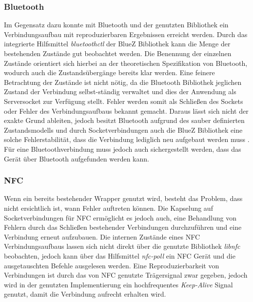 		\subsubsection{Bluetooth} Im Gegensatz dazu konnte mit Bluetooth und der genutzten Bibliothek ein \linebreak Verbindungsaufbau mit reproduzierbaren Ergebnissen erreicht werden. Durch das integrierte Hilfsmittel {\it bluetoothctl} der BlueZ Bibliothek kann die Menge der bestehenden Zustände gut beobachtet werden. Die Benennung der einzelnen Zustände orientiert sich hierbei an der theoretischen Spezifikation von Bluetooth, wodurch auch die Zustandsübergänge bereits klar werden. Eine feinere Betrachtung der Zustände ist nicht nötig, da die Bluetooth Bibliothek jeglichen Zustand der Verbindung selbst-ständig verwaltet und dies der Anwendung als Serversocket zur Verfügung stellt. Fehler werden somit als Schließen des Sockets oder Fehler des Verbindungsaufbaus bekannt gemacht. Daraus lässt sich nicht der exakte Grund ableiten, jedoch besitzt Bluetooth aufgrund des sauber definierten Zustandsmodells und durch Socketverbindungen auch die BlueZ Bibliothek eine solche Fehlerstabilität, dass die Verbindung lediglich neu aufgebaut werden muss \cite{bluetoothSpec}. Für eine Bluetoothverbindung muss jedoch auch  sichergestellt werden, dass das Gerät über Bluetooth aufgefunden werden kann.
		
          \subsubsection{NFC} Wenn ein bereits bestehender Wrapper genutzt wird, besteht das Problem, dass nicht ersichtlich ist, wann Fehler auftreten können. Die Kapselung auf Socketverbindungen für NFC ermöglicht es jedoch auch, eine Behandlung von Fehlern durch das Schließen bestehender Verbindungen durchzuführen und eine Verbindung erneut aufzubauen. Die internen Zustände eines NFC Verbindungsaufbaus lassen sich nicht direkt über die genutzte Bibliothek {\it libnfc} beobachten, jedoch kann über das Hilfsmittel {\it nfc-poll} ein NFC Gerät und die ausgetauschten Befehle ausgelesen werden. Eine Reproduzierbarkeit von Verbindungen ist durch das von NFC genutzte Trägersignal zwar gegeben, jedoch wird in der genutzten Implementierung ein hochfrequentes {\it Keep-Alive} Signal genutzt, damit die Verbindung aufrecht erhalten wird.
     

